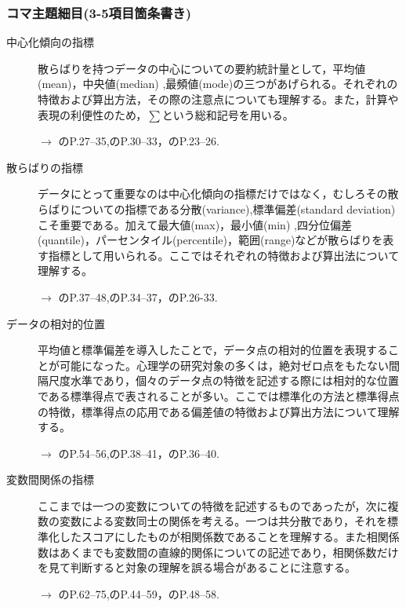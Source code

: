 \subsubsection{コマ主題細目(3-5項目箇条書き)}
\begin{description}
\item[中心化傾向の指標] 散らばりを持つデータの中心についての要約統計量として，平均値(mean)，中央値(median) ,最頻値(mode)の三つがあげられる。それぞれの特徴および算出方法，その際の注意点についても理解する。また，計算や表現の利便性のため，$\sum$という総和記号を用いる。
\begin{flushright}
    $\to$ \citet{山内201001}のP.27--35,\citet{Yamada2004}のP.30--33，\citet{川端201408}のP.23--26.
\end{flushright}

\item[散らばりの指標] データにとって重要なのは中心化傾向の指標だけではなく，むしろその散らばりについての指標である分散(variance),標準偏差(standard deviation)こそ重要である。加えて最大値(max)，最小値(min) ,四分位偏差(quantile)，パーセンタイル(percentile)，範囲(range)などが散らばりを表す指標として用いられる。ここではそれぞれの特徴および算出法について理解する。
\begin{flushright}
    $\to$ \citet{山内201001}のP.37--48,\citet{Yamada2004}のP.34--37，\citet{川端201408}のP.26-33.
\end{flushright}


\item[データの相対的位置]平均値と標準偏差を導入したことで，データ点の相対的位置を表現することが可能になった。心理学の研究対象の多くは，絶対ゼロ点をもたない間隔尺度水準であり，個々のデータ点の特徴を記述する際には相対的な位置である標準得点で表されることが多い。ここでは標準化の方法と標準得点の特徴，標準得点の応用である偏差値の特徴および算出方法について理解する。
\begin{flushright}
    $\to$ \citet{山内201001}のP.54--56,\citet{Yamada2004}のP.38--41，\citet{川端201408}のP.36--40.
\end{flushright}

\item[変数間関係の指標]ここまでは一つの変数についての特徴を記述するものであったが，次に複数の変数による変数同士の関係を考える。一つは共分散であり，それを標準化したスコアにしたものが相関係数であることを理解する。また相関係数はあくまでも変数間の直線的関係についての記述であり，相関係数だけを見て判断すると対象の理解を誤る場合があることに注意する。
\begin{flushright}
    $\to$ \citet{山内201001}のP.62--75,\citet{Yamada2004}のP.44--59，\citet{川端201408}のP.48--58.
\end{flushright}


\end{description}
